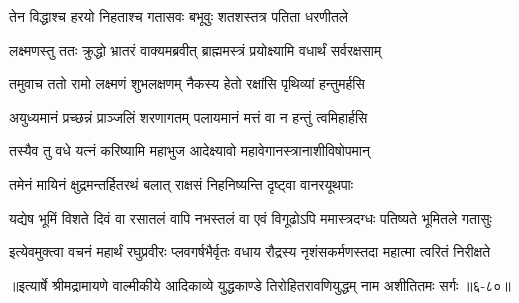 \twolineshloka
{तेन विद्धाश्च हरयो निहताश्च गतासवः}
{बभूवुः शतशस्तत्र पतिता धरणीतले} %

\twolineshloka
{लक्ष्मणस्तु ततः क्रुद्धो भ्रातरं वाक्यमब्रवीत्}
{ब्राह्ममस्त्रं प्रयोक्ष्यामि वधार्थं सर्वरक्षसाम्} %

\twolineshloka
{तमुवाच ततो रामो लक्ष्मणं शुभलक्षणम्}
{नैकस्य हेतो रक्षांसि पृथिव्यां हन्तुमर्हसि} %

\twolineshloka
{अयुध्यमानं प्रच्छन्नं प्राञ्जलिं शरणागतम्}
{पलायमानं मत्तं वा न हन्तुं त्वमिहार्हसि} %

\twolineshloka
{तस्यैव तु वधे यत्नं करिष्यामि महाभुज}
{आदेक्ष्यावो महावेगानस्त्रानाशीविषोपमान्} %

\twolineshloka
{तमेनं मायिनं क्षुद्रमन्तर्हितरथं बलात्}
{राक्षसं निहनिष्यन्ति दृष्ट्वा वानरयूथपाः} %

\twolineshloka
{यद्येष भूमिं विशते दिवं वा रसातलं वापि नभस्तलं वा}
{एवं विगूढोऽपि ममास्त्रदग्धः पतिष्यते भूमितले गतासुः} %

\twolineshloka
{इत्येवमुक्त्वा वचनं महार्थं रघुप्रवीरः प्लवगर्षभैर्वृतः}
{वधाय रौद्रस्य नृशंसकर्मणस्तदा महात्मा त्वरितं निरीक्षते} %


॥इत्यार्षे श्रीमद्रामायणे वाल्मीकीये आदिकाव्ये युद्धकाण्डे तिरोहितरावणियुद्धम् नाम अशीतितमः सर्गः ॥६-८०॥
